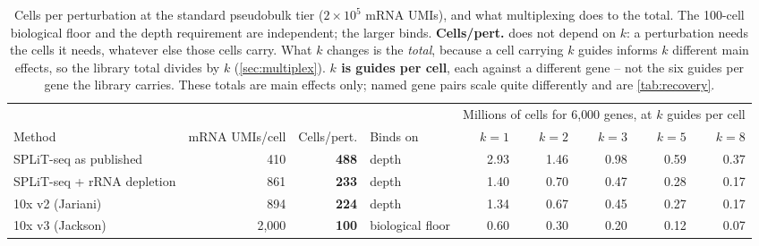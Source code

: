 \begin{table}[htbp]\centering
\footnotesize
\caption[]{Cells per perturbation at the standard pseudobulk tier ($2\times10^{5}$ mRNA UMIs), and what multiplexing does to the total. The 100-cell biological floor and the depth requirement are independent; the larger binds. \textbf{Cells/pert.} does not depend on $k$: a perturbation needs the cells it needs, whatever else those cells carry. What $k$ changes is the \emph{total}, because a cell carrying $k$ guides informs $k$ different main effects, so the library total divides by $k$ (\cref{sec:multiplex}). \textbf{$k$ is guides per cell}, each against a different gene -- not the six guides per gene the library carries. These totals are main effects only; named gene pairs scale quite differently and are \cref{tab:recovery}.}\label{tab:cells-per-pert}
\begin{tabular}{lrrlrrrrr}
\toprule
& & & & \multicolumn{5}{c}{Millions of cells for 6{,}000 genes, at $k$ guides per cell} \\
\cmidrule(l){5-9}
Method & mRNA UMIs/cell & Cells/pert. & Binds on & $k=1$ & $k=2$ & $k=3$ & $k=5$ & $k=8$ \\
\midrule
SPLiT-seq as published & 410 & \textbf{488} & depth & 2.93 & 1.46 & 0.98 & 0.59 & 0.37 \\
SPLiT-seq + rRNA depletion & 861 & \textbf{233} & depth & 1.40 & 0.70 & 0.47 & 0.28 & 0.17 \\
10x v2 (Jariani) & 894 & \textbf{224} & depth & 1.34 & 0.67 & 0.45 & 0.27 & 0.17 \\
10x v3 (Jackson) & 2{,}000 & \textbf{100} & biological floor & 0.60 & 0.30 & 0.20 & 0.12 & 0.07 \\
\bottomrule
\end{tabular}
\end{table}
